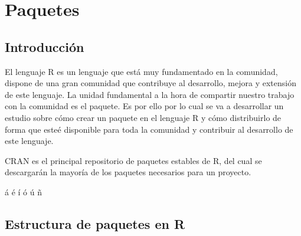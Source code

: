 \section{Paquetes}
\subsection{Introducci\'on}


El lenguaje R es un lenguaje que est\'a muy fundamentado en la comunidad, dispone de una gran comunidad que 
contribuye al desarrollo, mejora y extensi\'on de este lenguaje. La unidad fundamental a la hora de compartir 
nuestro trabajo con la comunidad es el paquete. Es por ello por lo cual se va a desarrollar un estudio sobre 
c\'omo crear un paquete en el lenguaje R y c\'omo distribuirlo de forma que este\'e disponible para toda la 
comunidad y contribuir al desarrollo de este lenguaje.

CRAN es el principal repositorio de paquetes estables de R, del cual se descargarán la mayoría de los paquetes necesarios para un proyecto.

\'a
\'e
\'i
\'o
\'u
\~n

\subsection{Estructura de paquetes en R}

